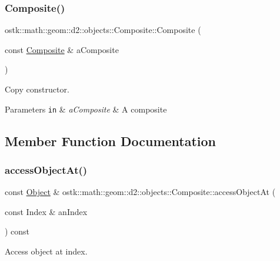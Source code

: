 \subsubsection{\texorpdfstring{Composite()}{Composite()}\hspace{0.1cm}{\footnotesize\ttfamily [4/4]}}
{\footnotesize\ttfamily ostk\+::math\+::geom\+::d2\+::objects\+::\+Composite\+::\+Composite (\begin{DoxyParamCaption}\item[{const \hyperlink{classostk_1_1math_1_1geom_1_1d2_1_1objects_1_1_composite}{Composite} \&}]{a\+Composite }\end{DoxyParamCaption})}



Copy constructor. 


\begin{DoxyParams}[1]{Parameters}
\mbox{\tt in}  & {\em a\+Composite} & A composite \\
\hline
\end{DoxyParams}


\subsection{Member Function Documentation}
\mbox{\label{classostk_1_1math_1_1geom_1_1d2_1_1objects_1_1_composite_a787c345114be4936e5507cc52d1d1c54}} 
\subsubsection{\texorpdfstring{access\+Object\+At()}{accessObjectAt()}}
{\footnotesize\ttfamily const \hyperlink{classostk_1_1math_1_1geom_1_1d2_1_1_object}{Object} \& ostk\+::math\+::geom\+::d2\+::objects\+::\+Composite\+::access\+Object\+At (\begin{DoxyParamCaption}\item[{const Index \&}]{an\+Index }\end{DoxyParamCaption}) const}



Access object at index. 


